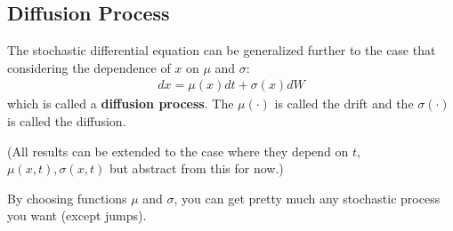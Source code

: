 \documentclass[11pt]{elegantbook}
\begin{document}
\subsection{Diffusion Process}
\begin{definition}
    The stochastic differential equation can be generalized further to the case that considering the dependence of $x$ on $\mu$ and $\sigma$:
    \begin{equation}
        \begin{aligned}
            dx=\mu(x)dt+\sigma(x)dW
        \end{aligned}
        \nonumber
    \end{equation}
    which is called a \textbf{diffusion process}. The $\mu(\cdot)$ is called the drift and the $\sigma(\cdot)$ is called the diffusion.
\end{definition}
(All results can be extended to the case where they depend on $t$,
$\mu(x, t), \sigma(x, t)$ but abstract from this for now.)
\begin{note}
    By choosing functions $\mu$ and $\sigma$, you can get pretty much any stochastic process you want (except jumps).
\end{note}
\end{document}
